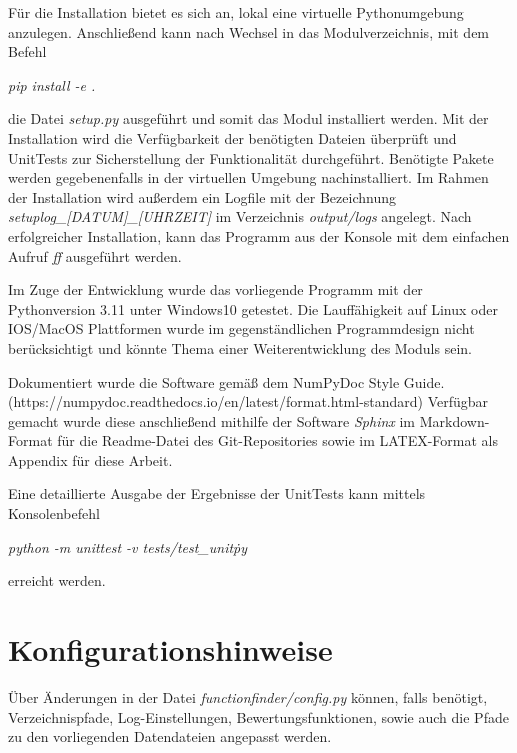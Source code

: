 \begin{tabular}{c}  %

\end{tabular}


Für die Installation bietet es sich an, lokal eine virtuelle Pythonumgebung anzulegen. Anschließend kann nach Wechsel in das Modulverzeichnis, mit dem Befehl
\begin{center}\emph{pip install -e .}\end{center}
die Datei \emph{setup.py} ausgeführt und somit das Modul installiert werden.
Mit der Installation wird die Verfügbarkeit der benötigten Dateien überprüft und UnitTests zur Sicherstellung der Funktionalität durchgeführt. Benötigte Pakete werden gegebenenfalls in der virtuellen Umgebung nachinstalliert. Im Rahmen der Installation wird außerdem ein Logfile mit der Bezeichnung \emph{setuplog\_[DATUM]\_[UHRZEIT]} im Verzeichnis \emph{output/logs} angelegt.
Nach erfolgreicher Installation, kann das Programm aus der Konsole mit dem einfachen Aufruf \emph{ff} ausgeführt werden.

Im Zuge der Entwicklung wurde das vorliegende Programm mit der Pythonversion 3.11 unter Windows10 getestet. Die Lauffähigkeit auf Linux oder IOS/MacOS Plattformen wurde im gegenständlichen Programmdesign nicht berücksichtigt und könnte Thema einer Weiterentwicklung des Moduls sein.

Dokumentiert wurde die Software gemäß dem NumPyDoc Style Guide. (https://numpydoc.readthedocs.io/en/latest/format.html-standard) Verfügbar gemacht wurde diese anschließend mithilfe der Software \emph{Sphinx} im Markdown-Format für die Readme-Datei des Git-Repositories sowie im LATEX-Format als Appendix für diese Arbeit.

Eine detaillierte Ausgabe der Ergebnisse der UnitTests kann mittels Konsolenbefehl
\begin{center}
\emph{python -m unittest -v tests/test\_unit\.py}
\end{center}
erreicht werden. 

\section{Konfigurationshinweise}

Über Änderungen in der Datei \emph{functionfinder/config.py} können, falls benötigt, Verzeichnispfade, Log-Einstellungen, Bewertungsfunktionen, sowie auch die Pfade zu den vorliegenden Datendateien angepasst werden.

